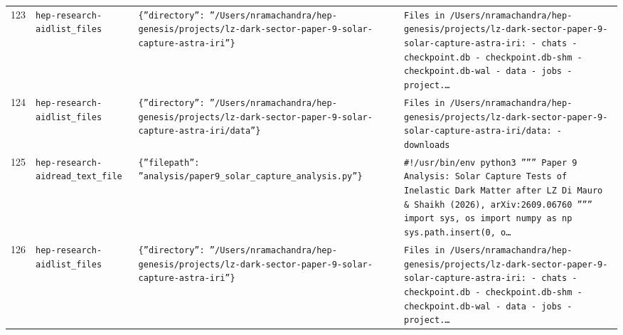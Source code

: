 \documentclass[11pt,a4paper]{article}
\begin{document}
\begin{longtable}{@{}p{}p{}p{}p{}@{}}
123 & \texttt{hep-research-aid}\newline\texttt{list\_\allowbreak{}files} & \texttt{\{''directory'':\allowbreak{} ''/\allowbreak{}Users/\allowbreak{}nramachandra/\allowbreak{}hep-genesis/\allowbreak{}projects/\allowbreak{}lz-dark-sector-paper-9-solar-capture-astra-iri''\}\allowbreak{}} & \texttt{Files in /\allowbreak{}Users/\allowbreak{}nramachandra/\allowbreak{}hep-genesis/\allowbreak{}projects/\allowbreak{}lz-dark-sector-paper-9-solar-capture-astra-iri:\allowbreak{}   - chats   - checkpoint.db   - checkpoint.db-shm   - checkpoint.db-wal   - data   - jobs   - project.\ldots{}\allowbreak{}} \\
124 & \texttt{hep-research-aid}\newline\texttt{list\_\allowbreak{}files} & \texttt{\{''directory'':\allowbreak{} ''/\allowbreak{}Users/\allowbreak{}nramachandra/\allowbreak{}hep-genesis/\allowbreak{}projects/\allowbreak{}lz-dark-sector-paper-9-solar-capture-astra-iri/\allowbreak{}data''\}\allowbreak{}} & \texttt{Files in /\allowbreak{}Users/\allowbreak{}nramachandra/\allowbreak{}hep-genesis/\allowbreak{}projects/\allowbreak{}lz-dark-sector-paper-9-solar-capture-astra-iri/\allowbreak{}data:\allowbreak{}   - downloads} \\
125 & \texttt{hep-research-aid}\newline\texttt{read\_\allowbreak{}text\_\allowbreak{}file} & \texttt{\{''filepath'':\allowbreak{} ''analysis/\allowbreak{}paper9\_\allowbreak{}solar\_\allowbreak{}capture\_\allowbreak{}analysis.py''\}\allowbreak{}} & \texttt{\#!/\allowbreak{}usr/\allowbreak{}bin/\allowbreak{}env python3 '''''' Paper 9 Analysis:\allowbreak{} Solar Capture Tests of Inelastic Dark Matter after LZ Di Mauro \& Shaikh (2026)\allowbreak{},\allowbreak{} arXiv:\allowbreak{}2609.06760 '''''' import sys,\allowbreak{} os import numpy as np sys.path.insert(0,\allowbreak{} o\ldots{}\allowbreak{}} \\
126 & \texttt{hep-research-aid}\newline\texttt{list\_\allowbreak{}files} & \texttt{\{''directory'':\allowbreak{} ''/\allowbreak{}Users/\allowbreak{}nramachandra/\allowbreak{}hep-genesis/\allowbreak{}projects/\allowbreak{}lz-dark-sector-paper-9-solar-capture-astra-iri''\}\allowbreak{}} & \texttt{Files in /\allowbreak{}Users/\allowbreak{}nramachandra/\allowbreak{}hep-genesis/\allowbreak{}projects/\allowbreak{}lz-dark-sector-paper-9-solar-capture-astra-iri:\allowbreak{}   - chats   - checkpoint.db   - checkpoint.db-shm   - checkpoint.db-wal   - data   - jobs   - project.\ldots{}\allowbreak{}} \\

\end{longtable}
\end{document}
